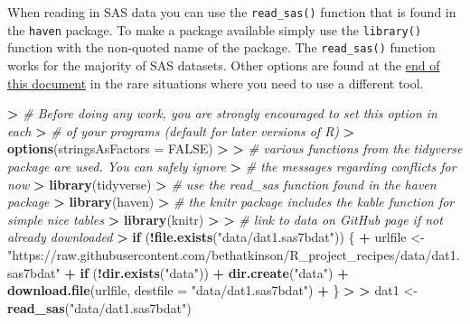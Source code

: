 \documentclass[
]{book}
\newenvironment{Shaded}{\begin{snugshade}}{\end{snugshade}}
\newcommand{\CommentTok}[1]{\textcolor[rgb]{0.56,0.35,0.01}{\textit{#1}}}
\newcommand{\ControlFlowTok}[1]{\textcolor[rgb]{0.13,0.29,0.53}{\textbf{#1}}}
\newcommand{\DataTypeTok}[1]{\textcolor[rgb]{0.13,0.29,0.53}{#1}}
\newcommand{\ErrorTok}[1]{\textcolor[rgb]{0.64,0.00,0.00}{\textbf{#1}}}
\newcommand{\KeywordTok}[1]{\textcolor[rgb]{0.13,0.29,0.53}{\textbf{#1}}}
\newcommand{\NormalTok}[1]{#1}
\newcommand{\OperatorTok}[1]{\textcolor[rgb]{0.81,0.36,0.00}{\textbf{#1}}}
\newcommand{\OtherTok}[1]{\textcolor[rgb]{0.56,0.35,0.01}{#1}}
\newcommand{\StringTok}[1]{\textcolor[rgb]{0.31,0.60,0.02}{#1}}
\begin{document}
When reading in SAS data you can use the \texttt{read\_sas()} function that is found in the \texttt{haven} package. To make a package available simply use the \texttt{library()} function with the non-quoted name of the package. The \texttt{read\_sas()} function works for the majority of SAS datasets. Other options are found at the \protect\hyperlink{alt-import}{end of this document} in the rare situations where you need to use a different tool.

\begin{Shaded}
\begin{Highlighting}[]
\OperatorTok{>}\StringTok{ }\CommentTok{# Before doing any work, you are strongly encouraged to set this option in each}
\ErrorTok{>}\StringTok{ }\CommentTok{# of your programs (default for later versions of R)}
\ErrorTok{>}\StringTok{ }\KeywordTok{options}\NormalTok{(}\DataTypeTok{stringsAsFactors =} \OtherTok{FALSE}\NormalTok{)}
\OperatorTok{>}\StringTok{ }
\ErrorTok{>}\StringTok{ }\CommentTok{# various functions from the tidyverse package are used.  You can safely ignore}
\ErrorTok{>}\StringTok{ }\CommentTok{# the messages regarding conflicts for now}
\ErrorTok{>}\StringTok{ }\KeywordTok{library}\NormalTok{(tidyverse)}
\OperatorTok{>}\StringTok{ }\CommentTok{# use the read_sas function found in the haven package}
\ErrorTok{>}\StringTok{ }\KeywordTok{library}\NormalTok{(haven)}
\OperatorTok{>}\StringTok{ }\CommentTok{# the knitr package includes the kable function for simple nice tables}
\ErrorTok{>}\StringTok{ }\KeywordTok{library}\NormalTok{(knitr)}
\OperatorTok{>}\StringTok{ }
\ErrorTok{>}\StringTok{ }\CommentTok{# link to data on GitHub page if not already downloaded}
\ErrorTok{>}\StringTok{ }\ControlFlowTok{if}\NormalTok{ (}\OperatorTok{!}\KeywordTok{file.exists}\NormalTok{(}\StringTok{"data/dat1.sas7bdat"}\NormalTok{)) \{}
\OperatorTok{+}\StringTok{     }\NormalTok{urlfile <-}\StringTok{ "https://raw.githubusercontent.com/bethatkinson/R_project_recipes/data/dat1.sas7bdat"}
\OperatorTok{+}\StringTok{     }\ControlFlowTok{if}\NormalTok{ (}\OperatorTok{!}\KeywordTok{dir.exists}\NormalTok{(}\StringTok{"data"}\NormalTok{)) }
\OperatorTok{+}\StringTok{         }\KeywordTok{dir.create}\NormalTok{(}\StringTok{"data"}\NormalTok{)}
\OperatorTok{+}\StringTok{     }\KeywordTok{download.file}\NormalTok{(urlfile, }\DataTypeTok{destfile =} \StringTok{"data/dat1.sas7bdat"}\NormalTok{)}
\OperatorTok{+}\StringTok{ }\NormalTok{\}}
\OperatorTok{>}\StringTok{ }
\ErrorTok{>}\StringTok{ }\NormalTok{dat1 <-}\StringTok{ }\KeywordTok{read_sas}\NormalTok{(}\StringTok{"data/dat1.sas7bdat"}\NormalTok{)}
\end{Highlighting}
\end{Shaded}
\end{document}
